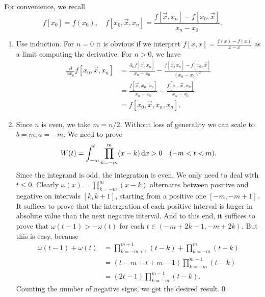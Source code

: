 \documentclass{homework}
\begin{document}
\begin{problem}
For convenience, we recall
\[f[x_0] = f(x_0), \quad f[x_0,\vec x,x_n] = \frac{f[\vec x,x_n] - f[x_0,\vec x]}{x_n - x_0}.\]
\begin{enumerate}[label=(\roman*)]
\item Use induction. For \(n=0\) it is obvious if we interpret \(f[x,x] = \frac{f(x)-f(x)}{x-x}\) as a limit computing the derivative. For \(n > 0\), we have
\begin{align*}
\frac{\partial}{\partial x_n} f[x_0, \vec x, x_n] &= \frac{\partial_n f[\vec x, x_n]}{x_n - x_0} - \frac{f[\vec x, x_n] - f[x_0, \vec x]}{(x_n - x_0)^2}\\
&= \frac{f[\vec x, x_n, x_n]}{x_n - x_0} - \frac{f[x_0, \vec x, x_n]}{x_n - x_0}\\
&= f[x_0,\vec x, x_n, x_n].
\end{align*}
\item Since \(n\) is even, we take \(m = n/2\). Without loss of generality we can scale to \(b = m, a = -m\). We need to prove
\[W(t) = \int_{-m}^t \prod_{k=-m}^m (x - k) \d[x] > 0 \quad (-m < t < m).\]
Since the integrand is odd, the integration is even. We only need to deal with \(t \le 0\). Clearly \(\omega(x) = \prod_{k=-m}^m (x-k)\) alternates between positive and negative on intervals \([k, k+1]\), starting from a positive one \([-m, -m+1]\). It suffices to prove that the intergration of each positive interval is larger in absolute value than the next negative interval. And to this end, it suffices to prove that \(\omega(t-1) > -\omega(t)\) for each \(t \in (-m + 2k-1, -m+2k)\). But this is easy, because
\begin{align*}
\omega(t-1) + \omega(t) &= \prod_{k=-m+1}^{m+1}(t-k) + \prod_{k=-m}^m(t-k)\\
&= (t-m + t + m - 1)\prod_{k=-m}^{m-1}(t-k)\\
&= (2t - 1) \prod_{k=-m}^{m-1}(t-k).
\end{align*}
Counting the number of negative signs, we get the desired result.\qed
\end{enumerate}
\renewcommand{\qedsymbol}{}
\end{problem}
\end{document}
